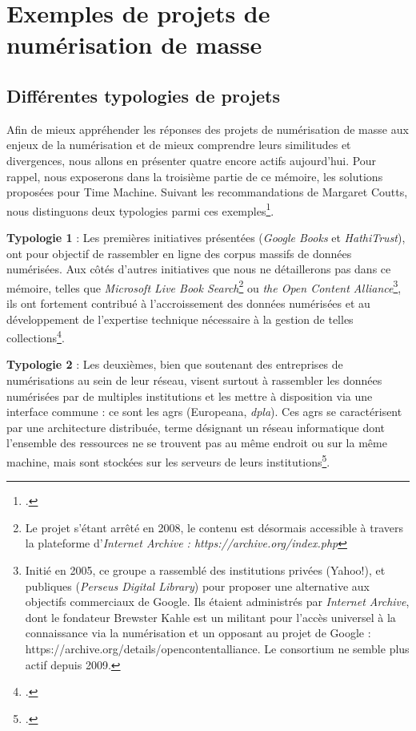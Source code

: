 \part{Exemples de projets de numérisation de masse }

\chapter{Différentes typologies de projets}

Afin de mieux appréhender les réponses des projets de numérisation de masse aux enjeux de la numérisation et de mieux comprendre leurs similitudes et divergences, nous allons en présenter quatre encore actifs aujourd'hui. Pour rappel, nous exposerons dans la troisième partie de ce mémoire, les solutions proposées pour Time Machine. Suivant les recommandations de Margaret Coutts, nous distinguons deux typologies parmi ces exemples\footcite{coutts_stepping_2017}. 

\textbf{Typologie 1} : Les premières initiatives présentées (\textit{Google Books} et \textit{HathiTrust}), ont pour objectif de rassembler en ligne des corpus massifs de données numérisées. Aux côtés d'autres initiatives que nous ne détaillerons pas dans ce mémoire, telles que \textit{Microsoft Live Book Search}\footnote{Le projet s'étant arrêté en 2008, le contenu est désormais accessible à travers la plateforme d'\textit{Internet Archive : https://archive.org/index.php}} ou \textit{the Open Content Alliance}\footnote{Initié en 2005, ce groupe a rassemblé des institutions privées (Yahoo!), et publiques (\textit{Perseus Digital Library}) pour proposer une alternative aux objectifs commerciaux de Google. Ils étaient administrés par \textit{Internet Archive}, dont le fondateur Brewster Kahle est un militant pour l'accès universel à la connaissance via la numérisation et un opposant au projet de Google : https://archive.org/details/opencontentalliance. Le consortium ne semble plus actif depuis 2009.}, ils ont fortement contribué à l'accroissement des données numérisées et au développement de l'expertise technique nécessaire à la gestion de telles collections\footcite[p.78]{coutts_stepping_2017}.

\textbf{Typologie 2} : Les deuxièmes, bien que soutenant des entreprises de numérisations au sein de leur réseau, visent surtout à rassembler les données numérisées par de multiples institutions et les mettre à disposition via une interface commune : ce sont les \gls{agr}s (Europeana, \textit{\gls{dpla}}). Ces \gls{agr}s se caractérisent par une architecture distribuée, terme désignant un réseau informatique dont l'ensemble des ressources ne se trouvent pas au même endroit ou sur la même machine, mais sont stockées sur les serveurs de leurs institutions\footcite[p.79]{coutts_stepping_2017}.

